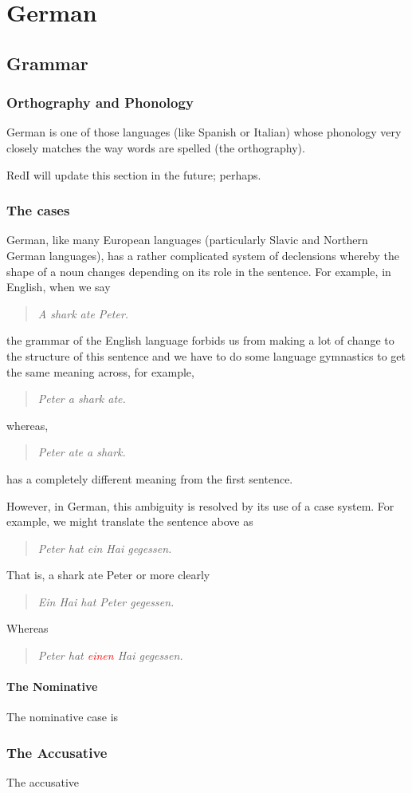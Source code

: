 \chapter{German}
\section{Grammar}
\subsection{Orthography and Phonology}
German is one of those languages (like Spanish or Italian) whose phonology
very closely matches the way words are spelled (the orthography).

\begin{color}{Red}I will update this section in the future;
  perhaps.\end{color}

\subsection{The cases}
German, like many European languages (particularly Slavic and Northern
German languages), has a rather complicated system of declensions whereby
the shape of a noun changes depending on its role in the sentence. For
example, in English, when we say
\begin{quote}
  \emph{A shark ate Peter.}
\end{quote}
the grammar of the English language forbids us from making a lot of change
to the structure of this sentence and we have to do some language
gymnastics to get the same meaning across, for example,
\begin{quote}
  \emph{Peter a shark ate.}
\end{quote}
whereas,
\begin{quote}
  \emph{Peter ate a shark.}
\end{quote}
has a completely different meaning from the first sentence.

However, in German, this ambiguity is resolved by its use of a case
system. For example, we might translate the sentence above as
\begin{quote}
  \emph{Peter hat ein Hai gegessen.}
\end{quote}
That is, a shark ate Peter or more clearly
\begin{quote}
  \emph{Ein Hai hat Peter gegessen.}
\end{quote}
Whereas
\begin{quote}
  \emph{Peter hat \textcolor{Red}{einen} Hai gegessen.}
\end{quote}

\subsubsection{The Nominative}
The nominative case is

\subsection{The Accusative}
The accusative

